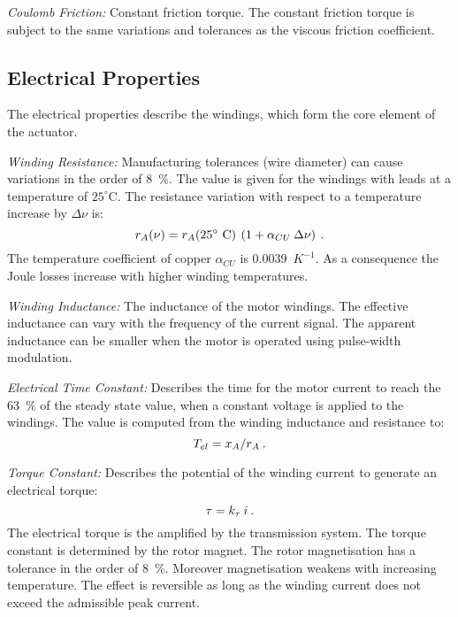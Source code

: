 \documentclass[a4paper,10pt]{cjtdsheet}      %
\begin{document}
\begin{multicols}{2}
\emph{Coulomb Friction:} Constant friction torque. The constant friction torque is subject to the same variations and tolerances as the viscous friction coefficient.

%
%
\subsection*{Electrical Properties}
The electrical properties describe the windings, which form the core element of the actuator. 

\emph{Winding Resistance:} Manufacturing tolerances (wire diameter) can cause variations in the order of 8~\%. The value is given for the windings with leads at a temperature of $25^\circ$C. The resistance variation with respect to a temperature increase by $\Delta \nu$ is:
\begin{equation}
	r_A(\nu) = r_A(25^\circ\text{ C})\:\left(1+\alpha_{CU} 	\: \Delta \nu\right)	\:.
\end{equation}
The temperature coefficient of copper $\alpha_{CU}$ is 0.0039~$K^{-1}$. As a consequence the Joule losses increase with higher winding temperatures.
 
\emph{Winding Inductance:} The inductance of the motor windings. The effective inductance can vary with the frequency of the current signal. The apparent inductance can be smaller when the motor is operated using pulse-width modulation.

\emph{Electrical Time Constant:} Describes the time for the motor current to reach the 63~\% of the steady state value, when a constant voltage is applied to the windings. The value is computed from the winding inductance and resistance to:
\begin{equation}
T_{el} = x_A / r_A\:.
\end{equation}

\emph{Torque Constant:} Describes the potential of the winding current to generate an electrical torque:
\begin{equation}
	\tau = k_\tau \: i\:.
\end{equation}
The electrical torque is the amplified by the transmission system. The torque constant is determined by the rotor magnet. The rotor magnetisation has a tolerance in the order of 8~\%. Moreover magnetisation weakens with increasing temperature. The effect is reversible as long as the winding current does not exceed the admissible peak current.


\end{multicols}
\end{document}
